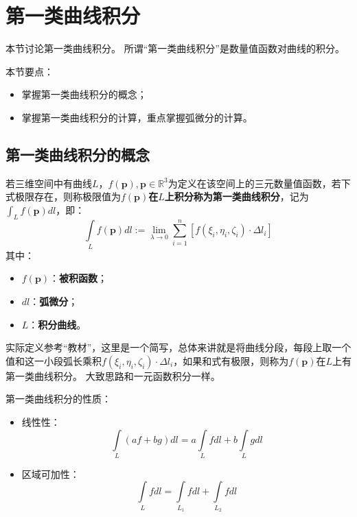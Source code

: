 \section{第一类曲线积分}

本节讨论第一类曲线积分。
所谓“第一类曲线积分”是数量值函数对曲线的积分。

本节要点：
\begin{itemize}
    \item 掌握第一类曲线积分的概念；
    \item 掌握第一类曲线积分的计算，重点掌握弧微分的计算。
\end{itemize}

\subsection{第一类曲线积分的概念}

\begin{definition}[第一类曲线积分]
若三维空间中有曲线$L$，$f\left( \boldsymbol{p} \right) ,\boldsymbol{p}\in \mathbb{R} ^3$为定义在该空间上的三元数量值函数，若下式极限存在，则称极限值为{\bf $f\left( \boldsymbol{p} \right) $在$L$上积分称为第一类曲线积分}，记为$\int_L{f\left( \boldsymbol{p} \right) dl}$，即：
\[
\int\limits_L{f\left( \boldsymbol{p} \right) dl}:=\underset{\lambda \rightarrow 0}{\lim}\sum_{i=1}^n{\left[ f\left( \xi _i,\eta _i,\zeta _i \right) \cdot \Delta l_i \right]}
\]
其中：
\begin{itemize}
    \item $f\left( \boldsymbol{p} \right) $：{\bf 被积函数}；
    \item $dl$：{\bf 弧微分}；
    \item $L$：{\bf 积分曲线}。
\end{itemize}
\end{definition}

\begin{tcolorbox}
实际定义参考“教材\cite{book1}”，这里是一个简写，总体来讲就是将曲线分段，每段上取一个值和这一小段弧长乘积$f\left( \xi _i,\eta _i,\zeta _i \right) \cdot \Delta l_i$，如果和式有极限，则称为$f\left( \boldsymbol{p} \right) $在$L$上有第一类曲线积分。
大致思路和一元函数积分一样。
\end{tcolorbox}

第一类曲线积分的性质：
\begin{itemize}
    \item 线性性：
    \[
    \int\limits_L{\left( af+bg \right) dl}=a\int\limits_L{fdl}+b\int\limits_L{gdl}
    \]
    \item 区域可加性：
    \[
    \int\limits_L{fdl}=\int\limits_{L_1}{fdl}+\int\limits_{L_2}{fdl}
    \]
\end{itemize}

